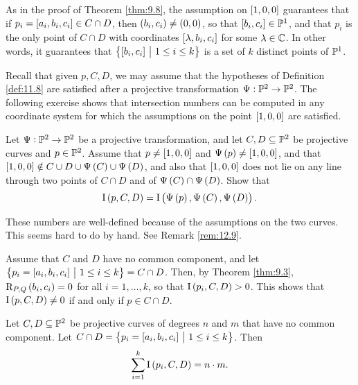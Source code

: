 \pagebreak

\begin{remark}
As in the proof of Theorem \ref{thm:9.8}, the assumption on $ \sbr{1, 0, 0} $ guarantees that if $ p_i = \sbr{a_i, b_i, c_i} \in C \cap D $, then $ \br{b_i, c_i} \ne \br{0, 0} $, so that $ \sbr{b_i, c_i} \in \PP^1 $, and that $ p_i $ is the only point of $ C \cap D $ with coordinates $ \sbr{\lambda, b_i, c_i} $ for some $ \lambda \in \mathbb{C} $. In other words, it guarantees that $ \cbr{\sbr{b_i, c_i} \st 1 \le i \le k} $ is a set of $ k $ distinct points of $ \mathbb{P}^1 $.
\end{remark}

Recall that given $ p, C, D $, we may assume that the hypotheses of Definition \ref{def:11.8} are satisfied after a projective transformation $ \Psi : \mathbb{P}^2 \to \mathbb{P}^2 $. The following exercise shows that intersection numbers can be computed in any coordinate system for which the assumptions on the point $ \sbr{1, 0, 0} $ are satisfied.

\begin{exercise**}
Let $ \Psi : \mathbb{P}^2 \to \mathbb{P}^2 $ be a projective transformation, and let $ C, D \subseteq \mathbb{P}^2 $ be projective curves and $ p \in \mathbb{P}^2 $. Assume that $ p \ne \sbr{1, 0, 0} $ and $ \Psi\br{p} \ne \sbr{1, 0, 0} $, and that $ \sbr{1, 0, 0} \notin C \cup D \cup \Psi\br{C} \cup \Psi\br{D} $, and also that $ \sbr{1, 0, 0} $ does not lie on any line through two points of $ C \cap D $ and of $ \Psi\br{C} \cap \Psi\br{D} $. Show that
$$ \I\br{p, C, D} = \I\br{\Psi\br{p}, \Psi\br{C}, \Psi\br{D}}. $$
\end{exercise**}

\begin{note*}
These numbers are well-defined because of the assumptions on the two curves. This seems hard to do by hand. See Remark \ref{rem:12.9}.
\end{note*}

\begin{remark}
\label{rem:11.10}
Assume that $ C $ and $ D $ have no common component, and let $ \cbr{p_i = \sbr{a_i, b_i, c_i} \st 1 \le i \le k} = C \cap D $. Then, by Theorem \ref{thm:9.3}, $ \R_{P, Q}\br{b_i, c_i} = 0 $ for all $ i = 1, \dots, k $, so that $ \I\br{p_i, C, D} > 0 $. This shows that $ \I\br{p, C, D} \ne 0 $ if and only if $ p \in C \cap D $.
\end{remark}

\begin{theorem}
\label{thm:11.11}
Let $ C, D \subseteq \mathbb{P}^2 $ be projective curves of degrees $ n $ and $ m $ that have no common component. Let $ C \cap D = \cbr{p_i = \sbr{a_i, b_i, c_i} \st 1 \le i \le k} $. Then
$$ \sum_{i = 1}^k \I\br{p_i, C, D} = n \cdot m. $$
\end{theorem}

